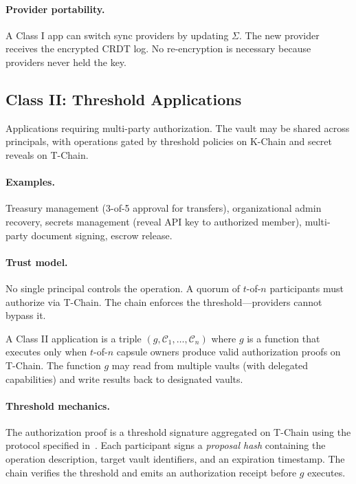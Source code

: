 \paragraph{Provider portability.} A Class I app can switch sync providers by
updating $\Sigma$. The new provider receives the encrypted CRDT log. No
re-encryption is necessary because providers never held the key.

\subsection{Class II: Threshold Applications}\label{sec:class2}

Applications requiring multi-party authorization. The vault may be shared across
principals, with operations gated by threshold policies on K-Chain and secret
reveals on T-Chain.

\paragraph{Examples.} Treasury management (3-of-5 approval for transfers),
organizational admin recovery, secrets management (reveal API key to authorized
member), multi-party document signing, escrow release.

\paragraph{Trust model.} No single principal controls the operation. A quorum
of $t$-of-$n$ participants must authorize via T-Chain. The chain enforces the
threshold---providers cannot bypass it.

\begin{definition}\label{def:class2}
A Class II application is a triple $(g, \mathcal{C}_1, \ldots, \mathcal{C}_n)$
where $g$ is a function that executes only when $t$-of-$n$ capsule owners
produce valid authorization proofs on T-Chain. The function $g$ may read from
multiple vaults (with delegated capabilities) and write results back to
designated vaults.
\end{definition}

\paragraph{Threshold mechanics.} The authorization proof is a threshold signature
aggregated on T-Chain using the protocol specified in~\cite{lux-mchain-mpc}.
Each participant signs a \textit{proposal hash} containing the operation
description, target vault identifiers, and an expiration timestamp. The chain
verifies the threshold and emits an authorization receipt before $g$ executes.

